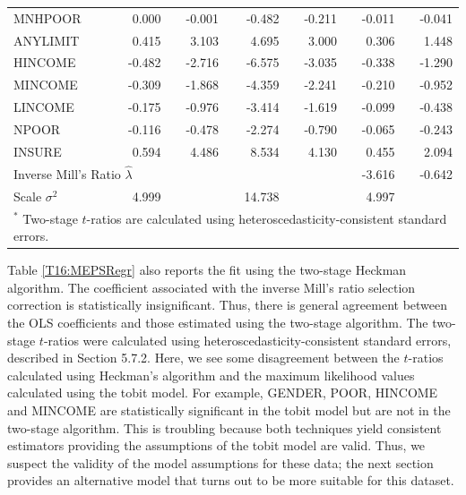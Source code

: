 \begin{table}[h]
\begin{tabular}{lrrrrrr}
   MNHPOOR &      0.000 &     -0.001 &     -0.482 &     -0.211 &     -0.011 &     -0.041 \\
  ANYLIMIT &      0.415 &      3.103 &      4.695 &      3.000 &      0.306 &      1.448 \\
    \hline
   HINCOME &     -0.482 &     -2.716 &     -6.575 &     -3.035 &     -0.338 &     -1.290 \\
   MINCOME &     -0.309 &     -1.868 &     -4.359 &     -2.241 &     -0.210 &     -0.952 \\
   LINCOME &     -0.175 &     -0.976 &     -3.414 &     -1.619 &     -0.099 &     -0.438 \\
     NPOOR &     -0.116 &     -0.478 &     -2.274 &     -0.790 &     -0.065 &     -0.243 \\
    INSURE &      0.594 &      4.486 &      8.534 &      4.130 &      0.455 &      2.094 \\
      \hline
\multicolumn{3}{l}{Inverse Mill's Ratio $\widehat{\lambda}$}  &  & & -3.616 &     -0.642 \\
Scale $\sigma^2$&  4.999 &            &     14.738 &            &      4.997 &            \\
\hline \multicolumn{7}{l}{$^{\ast}$ Two-stage $t$-ratios are calculated using heteroscedasticity-consistent standard errors.} \\
\hline
\end{tabular}
\end{table}


Table \ref{T16:MEPSRegr} also reports the fit using the two-stage
Heckman algorithm. The coefficient associated with the inverse
Mill's ratio selection correction is statistically insignificant.
Thus, there is general agreement between the OLS coefficients and
those estimated using the two-stage algorithm. The two-stage
$t$-ratios were calculated using heteroscedasticity-consistent
standard errors, described in Section 5.7.2. Here, we see some
disagreement between the $t$-ratios calculated using Heckman's
algorithm and the maximum likelihood values calculated using the
tobit model. For example, GENDER, POOR, HINCOME and MINCOME are
statistically significant in the tobit model but are not in the
two-stage algorithm. This is troubling because both techniques yield
consistent estimators providing the assumptions of the tobit model
are valid. Thus, we suspect the validity of the model assumptions
for these data; the next section provides an alternative model that
turns out to be more suitable for this dataset.


